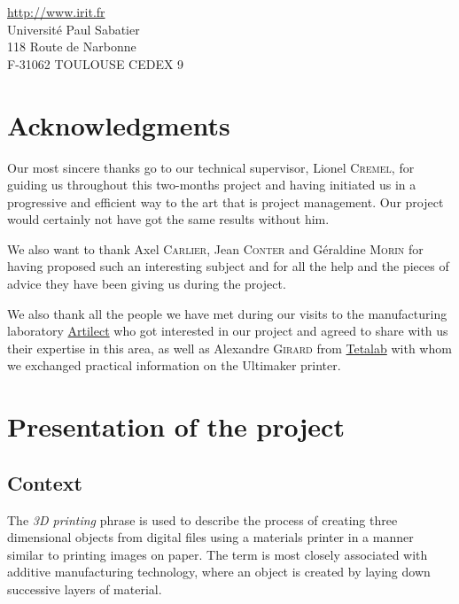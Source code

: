 \documentclass{report}
\begin{document}
\begin{center}
\url{http://www.irit.fr}\\
Université Paul Sabatier \\
118 Route de Narbonne \\
F-31062 TOULOUSE CEDEX 9
\end{center}

\thispagestyle{empty}

\newpage

\chapter*{Acknowledgments}

	Our most sincere thanks go to our technical supervisor, Lionel \textsc{Cremel}, for guiding us throughout this two-months project and having initiated us in a progressive and efficient way to the art that is project management. Our project would certainly not have got the same results without him.\\

\bigskip

	We also want to thank Axel \textsc{Carlier}, Jean \textsc{Conter} and Géraldine \textsc{Morin} for having proposed such an interesting subject and for all the help and the pieces of advice they have been giving us during the project.\\

\bigskip

	We also thank all the people we have met during our visits to the manufacturing laboratory \href{http://artilect.fr/}{Artilect} who got interested in our project and agreed to share with us their expertise in this area, as well as Alexandre \textsc{Girard} from \href{http://tetalab.org/}{Tetalab} with whom we exchanged practical information on the Ultimaker printer.


\tableofcontents

\chapter{Presentation of the project}

\section{Context}

	The \textit{3D printing} phrase is used to describe the process of creating three dimensional objects from digital files using a materials printer in a manner similar to printing images on paper. The term is most closely associated with additive manufacturing technology, where an object is created by laying down successive layers of material.\\
\end{document}
